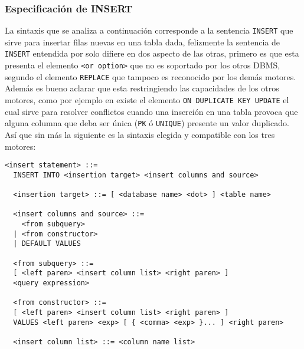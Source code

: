 \subsubsection{Especificación de INSERT} 
\label{especificacion:dialectos:insert}
La sintaxis que se analiza a continuación corresponde a la sentencia \verb=INSERT= que sirve para insertar filas nuevas en una tabla dada, felizmente la sentencia de \verb=INSERT= entendida por \s solo difiere en dos aspecto de las otras, primero es que esta presenta el elemento \verb=<or option>= que no es soportado por los otros DBMS, segundo el elemento \verb=REPLACE= que tampoco es reconocido por los demás motores. Además es bueno aclarar que \s esta restringiendo las capacidades de los otros motores, como por ejemplo en \m existe el elemento \verb=ON DUPLICATE KEY UPDATE= el cual sirve para resolver conflictos cuando una inserción en una tabla provoca que alguna columna que deba ser única (\verb=PK= ó \verb=UNIQUE=) presente un valor duplicado. Así que sin más la siguiente es la sintaxis elegida y compatible con los tres motores:
%
\begin{Verbatim}[frame=single, label=sintaxis para INSERT]
  <insert statement> ::=
  INSERT INTO <insertion target> <insert columns and source>

  <insertion target> ::= [ <database name> <dot> ] <table name>

  <insert columns and source> ::=
    <from subquery>
  | <from constructor>
  | DEFAULT VALUES

  <from subquery> ::=
  [ <left paren> <insert column list> <right paren> ]
  <query expression>
  
  <from constructor> ::=
  [ <left paren> <insert column list> <right paren> ]
  VALUES <left paren> <exp> [ { <comma> <exp> }... ] <right paren>

  <insert column list> ::= <column name list>
\end{Verbatim}
%
%
%
%
